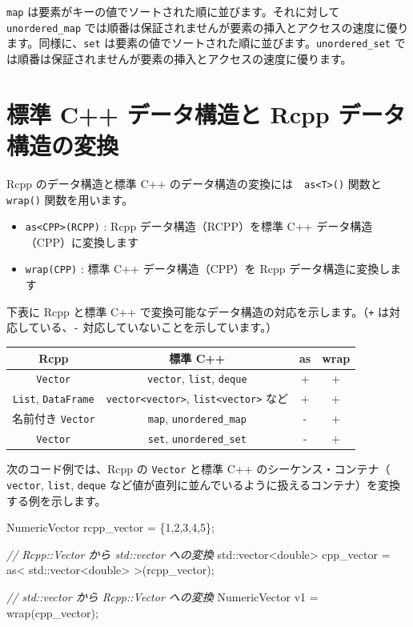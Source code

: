 \documentclass[]{book}
\newenvironment{Shaded}{\begin{snugshade}}{\end{snugshade}}
\newcommand{\BuiltInTok}[1]{#1}
\newcommand{\CommentTok}[1]{\textcolor[rgb]{0.56,0.35,0.01}{\textit{#1}}}
\newcommand{\DataTypeTok}[1]{\textcolor[rgb]{0.13,0.29,0.53}{#1}}
\newcommand{\DecValTok}[1]{\textcolor[rgb]{0.00,0.00,0.81}{#1}}
\newcommand{\NormalTok}[1]{#1}
\providecommand{\tightlist}{%
  \setlength{\itemsep}{0pt}\setlength{\parskip}{0pt}}
\begin{document}
\texttt{map} は要素がキーの値でソートされた順に並びます。それに対して \texttt{unordered\_map} では順番は保証されませんが要素の挿入とアクセスの速度に優ります。同様に、\texttt{set} は要素の値でソートされた順に並びます。\texttt{unordered\_set} では順番は保証されませんが要素の挿入とアクセスの速度に優ります。

\hypertarget{-c--rcpp-}{%
\section{標準 C++ データ構造と Rcpp データ構造の変換}\label{-c--rcpp-}}

Rcpp のデータ構造と標準 C++ のデータ構造の変換には　\texttt{as\textless{}T\textgreater{}()} 関数と \texttt{wrap()} 関数を用います。

\begin{itemize}
\tightlist
\item
  \texttt{as\textless{}CPP\textgreater{}(RCPP)} : Rcpp データ構造（RCPP）を標準 C++ データ構造（CPP）に変換します
\item
  \texttt{wrap(CPP)} : 標準 C++ データ構造（CPP）を Rcpp データ構造に変換します
\end{itemize}

下表に Rcpp と標準 C++ で変換可能なデータ構造の対応を示します。（\texttt{+} は対応している、\texttt{-} 対応していないことを示しています。）

\begin{longtable}[]{@{}cccc@{}}
\toprule
Rcpp & 標準 C++ & as & wrap\tabularnewline
\midrule
\endhead
\texttt{Vector} & \texttt{vector}, \texttt{list}, \texttt{deque} & + & +\tabularnewline
\texttt{List}, \texttt{DataFrame} & \texttt{vector\textless{}vector\textgreater{}}, \texttt{list\textless{}vector\textgreater{}} など & + & +\tabularnewline
名前付き \texttt{Vector} & \texttt{map}, \texttt{unordered\_map} & - & +\tabularnewline
\texttt{Vector} & \texttt{set}, \texttt{unordered\_set} & - & +\tabularnewline
\bottomrule
\end{longtable}

次のコード例では、Rcpp の \texttt{Vector} と標準 C++ のシーケンス・コンテナ（ \texttt{vector}, \texttt{list}, \texttt{deque} など値が直列に並んでいるように扱えるコンテナ）を変換する例を示します。

\begin{Shaded}
\begin{Highlighting}[]
\NormalTok{NumericVector   rcpp_vector = \{}\DecValTok{1}\NormalTok{,}\DecValTok{2}\NormalTok{,}\DecValTok{3}\NormalTok{,}\DecValTok{4}\NormalTok{,}\DecValTok{5}\NormalTok{\};}

\CommentTok{// Rcpp::Vector から std::vector への変換  }
\BuiltInTok{std::}\NormalTok{vector<}\DataTypeTok{double}\NormalTok{>  cpp_vector = as< }\BuiltInTok{std::}\NormalTok{vector<}\DataTypeTok{double}\NormalTok{> >(rcpp_vector);}

\CommentTok{// std::vector から Rcpp::Vector への変換  }
\NormalTok{NumericVector v1 = wrap(cpp_vector);}
\end{Highlighting}
\end{Shaded}
\end{document}
